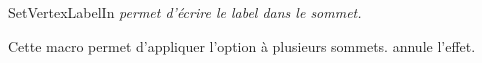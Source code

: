 \begin{NewMacroBox}{SetVertexLabelIn}{}
\emph{ permet d'écrire le label dans le sommet.}
\end{NewMacroBox}   

Cette macro permet d'appliquer l'option à plusieurs  sommets.  annule l'effet.

\begin{tkzexample}[latex=7cm,small]
\end{tkzexample}

\endinput  




% 
% 
% 


